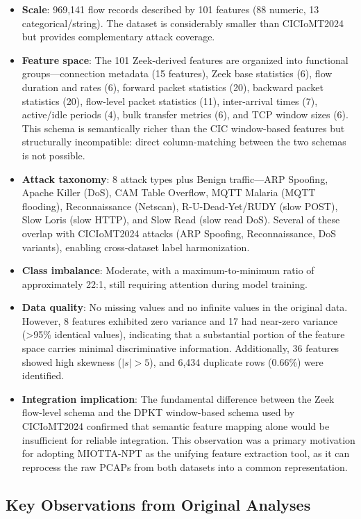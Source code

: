 \begin{itemize}
    \item \textbf{Scale}: 969,141 flow records described by 101 features (88 numeric, 13 categorical/string). The dataset is considerably smaller than CICIoMT2024 but provides complementary attack coverage.
    \item \textbf{Feature space}: The 101 Zeek-derived features are organized into functional groups---connection metadata (15 features), Zeek base statistics (6), flow duration and rates (6), forward packet statistics (20), backward packet statistics (20), flow-level packet statistics (11), inter-arrival times (7), active/idle periods (4), bulk transfer metrics (6), and TCP window sizes (6). This schema is semantically richer than the CIC window-based features but structurally incompatible: direct column-matching between the two schemas is not possible.
    \item \textbf{Attack taxonomy}: 8 attack types plus Benign traffic---ARP Spoofing, Apache Killer (DoS), CAM Table Overflow, MQTT Malaria (MQTT flooding), Reconnaissance (Netscan), R-U-Dead-Yet/RUDY (slow POST), Slow Loris (slow HTTP), and Slow Read (slow read DoS). Several of these overlap with CICIoMT2024 attacks (ARP Spoofing, Reconnaissance, DoS variants), enabling cross-dataset label harmonization.
    \item \textbf{Class imbalance}: Moderate, with a maximum-to-minimum ratio of approximately 22:1, still requiring attention during model training.
    \item \textbf{Data quality}: No missing values and no infinite values in the original data. However, 8 features exhibited zero variance and 17 had near-zero variance (>95\% identical values), indicating that a substantial portion of the feature space carries minimal discriminative information. Additionally, 36 features showed high skewness ($|s| > 5$), and 6,434 duplicate rows (0.66\%) were identified.
    \item \textbf{Integration implication}: The fundamental difference between the Zeek flow-level schema and the DPKT window-based schema used by CICIoMT2024 confirmed that semantic feature mapping alone would be insufficient for reliable integration. This observation was a primary motivation for adopting MIOTTA-NPT as the unifying feature extraction tool, as it can reprocess the raw PCAPs from both datasets into a common representation.
\end{itemize}

\subsection{Key Observations from Original Analyses}
\label{subsec:eda-summary}

